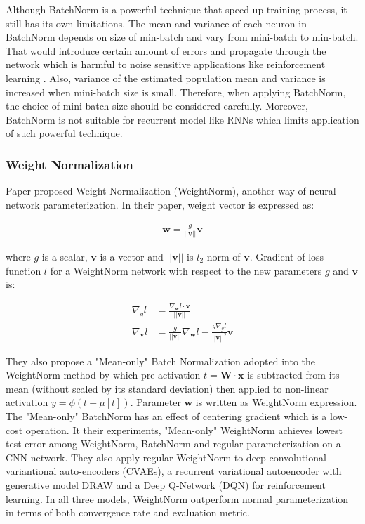\documentclass{article}
\begin{document}
Although BatchNorm is a powerful technique that speed up training process, it still has its own limitations. The mean and variance of each neuron in BatchNorm depends on size of min-batch and vary from mini-batch to min-batch. That would introduce certain amount of errors and propagate through the network which is harmful to noise sensitive applications like reinforcement learning \cite{reparameter}. Also, variance of the estimated population mean and variance is increased when mini-batch size is small. Therefore, when applying BatchNorm, the choice of mini-batch size should be considered carefully. Moreover, BatchNorm is not suitable for recurrent model like RNNs which limits application of such powerful technique.

\subsubsection{Weight Normalization}
Paper \cite{reparameter} proposed Weight Normalization (WeightNorm), another way of neural network parameterization. In their paper, weight vector is expressed as:

\begin{align*}
    \textbf{w}=\frac{g}{||\textbf{v}||}\textbf{v}
\end{align*}

where $g$ is a scalar, $\textbf{v}$ is a vector and $||\textbf{v}||$ is $l_2$ norm of $\textbf{v}$. Gradient of loss function $l$  for a WeightNorm network with respect to the new parameters $g$ and $\textbf{v}$ is:

\begin{align*}
    \nabla_gl &= \frac{\nabla_{\textbf{w}}l\cdot\textbf{v}}{||\textbf{v}||}\\
    \nabla_{\textbf{v}}l &= \frac{g}{||\textbf{v}||}\nabla_{\textbf{w}}l-\frac{g\nabla_gl}{||\textbf{v}||^2}\textbf{v}
\end{align*}

They also propose a "Mean-only" Batch Normalization adopted into the WeightNorm method by which pre-activation $t=\textbf{W}\cdot\textbf{x}$ is subtracted from its mean (without scaled by its standard deviation) then applied to non-linear activation $y=\phi(t-\mu[t])$. Parameter $\textbf{w}$ is written as WeightNorm expression. The "Mean-only" BatchNorm has an effect of centering gradient which is a low-cost operation. It their experiments, "Mean-only" WeightNorm achieves lowest test error among WeightNorm, BatchNorm and regular parameterization on a CNN network. They also apply regular WeightNorm to deep convolutional variantional auto-encoders (CVAEs), a recurrent variational autoencoder with generative model DRAW and  a Deep Q-Network (DQN) for reinforcement learning. In all three models, WeightNorm outperform normal parameterization in terms of both convergence rate and evaluation metric.
\end{document}
